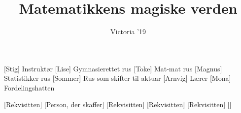 \documentclass[a4paper,11pt]{article}
\title{Matematikkens magiske verden}
\author{Victoria '19}
\begin{document}
\maketitle

\begin{roles}
[Stig] Instruktør
[Lise] Gymnasierettet rus
[Toke] Mat-mat rus
[Magnus] Statistikker rus
[Sommer] Rus som skifter til aktuar
[Arnvig] Lærer
[Mona] Fordelingshatten
\end{roles}

\begin{props}
[Rekvisitten]
[Person, der skaffer]
[Rekvisitten]
[Rekvisitten]
[Rekvisitten]
[]
\end{props}
\end{document}
